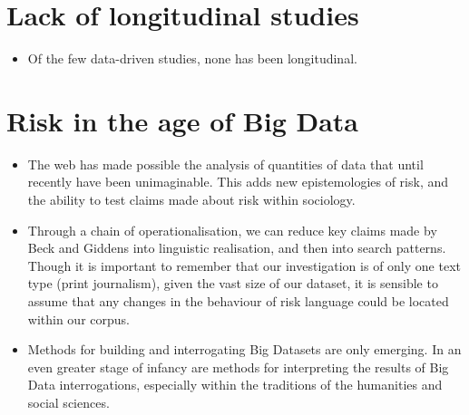 \section{Lack of longitudinal studies}

\begin{itemize}
    \item Of the few data-driven studies, none has been longitudinal.
\end{itemize}

\section{Risk in the age of Big Data}

\begin{itemize}
\item The web has made possible the analysis of quantities of data that until recently have been unimaginable. This adds new epistemologies of risk, and the ability to test claims made about risk within sociology. 
\item Through a chain of operationalisation, we can reduce key claims made by Beck and Giddens into linguistic realisation, and then into search patterns. Though it is important to remember that our investigation is of only one text type (print journalism), given the vast size of our dataset, it is sensible to assume that any changes in the behaviour of risk language could be located within our corpus.
\item Methods for building and interrogating Big Datasets are only emerging. In an even greater stage of infancy are methods for interpreting the results of Big Data interrogations, especially within the traditions of the humanities and social sciences.
\end{itemize}



%